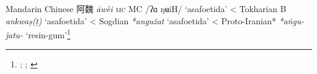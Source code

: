\begin{etymology}\label{ety:awei}
Mandarin Chinese {阿魏} \textit{āwèi} \textsc{mc} MC /ʔɑ ŋʉiH/ `asafoetida'
< Tokharian B \textit{ankwaṣ(ṭ)} `asafoetida'
< Sogdian \textit{*angužat} `asafoetida'
< Proto-Iranian* \textit{*aṅgu-ǰatu-} `resin-gum'\footnote{\textcite{leung_itinerary_2019}; \textcite[353]{laufer_sino-iranica_1919}; \textcite[438]{tremblay_irano-tocharica_2005}}
\end{etymology}